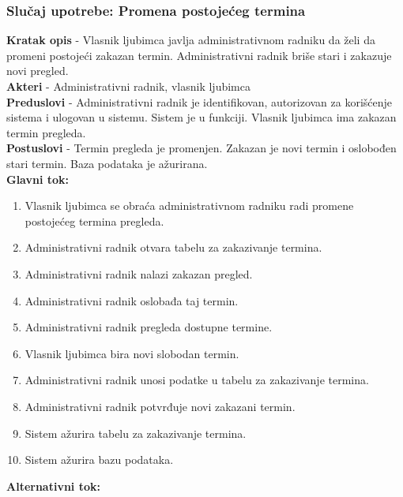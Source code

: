 \subsubsection{Slučaj upotrebe: Promena postojećeg termina}
\indent \textbf{Kratak opis} - Vlasnik ljubimca javlja administrativnom radniku da želi da promeni postojeći zakazan termin. Administrativni radnik briše stari i zakazuje novi pregled. \\
\indent \textbf{Akteri} - Administrativni radnik, vlasnik ljubimca \\
\indent \textbf{Preduslovi} - Administrativni radnik je identifikovan, autorizovan za korišćenje sistema i ulogovan u sistemu. Sistem je u funkciji. Vlasnik ljubimca ima zakazan termin pregleda. \\
\indent \textbf{Postuslovi} - Termin pregleda je promenjen. Zakazan je novi termin i oslobođen stari termin. Baza podataka je ažurirana. \\
\indent \textbf{Glavni tok:} 
\begin{enumerate}
 \item [1.] Vlasnik ljubimca se obraća administrativnom radniku radi promene postojećeg termina pregleda.
 \item[2.] Administrativni radnik otvara tabelu za zakazivanje termina.
 \item[3.] Administrativni radnik nalazi zakazan pregled.
 \item[4.] Administrativni radnik oslobađa taj termin.
 \item[5.] Administrativni radnik pregleda dostupne termine.
 \item[6.] Vlasnik ljubimca bira novi slobodan termin.
 \item[7.] Administrativni radnik unosi podatke u tabelu za zakazivanje termina.
 \item[8.] Administrativni radnik potvrđuje novi zakazani termin. 
 \item[9.] Sistem ažurira tabelu za zakazivanje termina.
 \item[10.] Sistem ažurira bazu podataka.
\end{enumerate}
\indent \textbf{Alternativni tok:}
